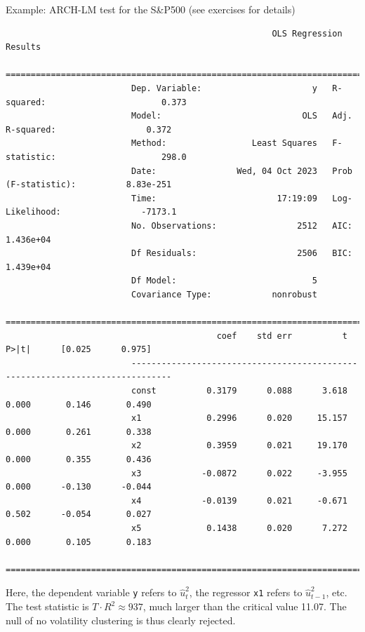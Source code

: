 \begin{frame}[fragile]
\begin{block}{Example: ARCH-LM test for the S\&P500 (see exercises for details)}
\tiny
\begin{verbatim}
                                                     OLS Regression Results                            
                         ==============================================================================
                         Dep. Variable:                      y   R-squared:                       0.373
                         Model:                            OLS   Adj. R-squared:                  0.372
                         Method:                 Least Squares   F-statistic:                     298.0
                         Date:                Wed, 04 Oct 2023   Prob (F-statistic):          8.83e-251
                         Time:                        17:19:09   Log-Likelihood:                -7173.1
                         No. Observations:                2512   AIC:                         1.436e+04
                         Df Residuals:                    2506   BIC:                         1.439e+04
                         Df Model:                           5                                         
                         Covariance Type:            nonrobust                                         
                         ==============================================================================
                                          coef    std err          t      P>|t|      [0.025      0.975]
                         ------------------------------------------------------------------------------
                         const          0.3179      0.088      3.618      0.000       0.146       0.490
                         x1             0.2996      0.020     15.157      0.000       0.261       0.338
                         x2             0.3959      0.021     19.170      0.000       0.355       0.436
                         x3            -0.0872      0.022     -3.955      0.000      -0.130      -0.044
                         x4            -0.0139      0.021     -0.671      0.502      -0.054       0.027
                         x5             0.1438      0.020      7.272      0.000       0.105       0.183
                         ==============================================================================
\end{verbatim}
\small Here, the dependent variable \texttt{y} refers to $\hat{u}^2_t$, the regressor \texttt{x1} refers to $\hat{u}^2_{t-1}$, etc. The test statistic is
$T\cdot R^2\approx 937$, much larger than the critical value 11.07. The null of no volatility clustering is thus clearly rejected.
\end{block}
\end{frame}


